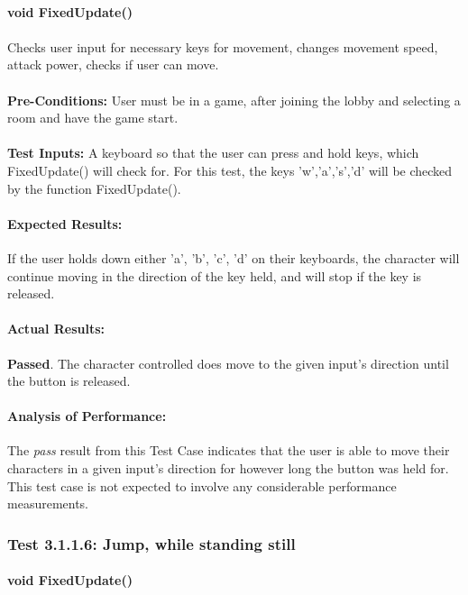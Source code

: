 \documentclass{article}
\begin{document}
    \paragraph{}\textbf{void FixedUpdate()}
    \paragraph{} Checks user input for necessary keys for movement, changes movement speed, attack power, checks if user can move.
    \paragraph{}\textbf{Pre-Conditions:} User must be in a game, after joining the lobby and selecting a room and have the game start.
    \paragraph{}\textbf{Test Inputs:} A keyboard so that the user can press and hold keys, which FixedUpdate() will check for. For this test, the keys 'w','a','s','d' will be checked by the function FixedUpdate(). 
    \paragraph{Expected Results:} If the user holds down either 'a', 'b', 'c', 'd' on their keyboards, the character will continue moving in the direction of the key held, and will stop if the key is released.
    \paragraph{Actual Results:} \textbf{Passed}. The character controlled does move to the given input's direction until the button is released. 
    \paragraph{Analysis of Performance:} The \emph{pass} result from this Test Case indicates that the user is able to move their characters in a given input's direction for however long the button was held for. This test case is not expected to involve any considerable performance measurements.
    
    \subsubsection{Test 3.1.1.6: Jump, while standing still}
    \paragraph{}\textbf{void FixedUpdate()}
\end{document}

